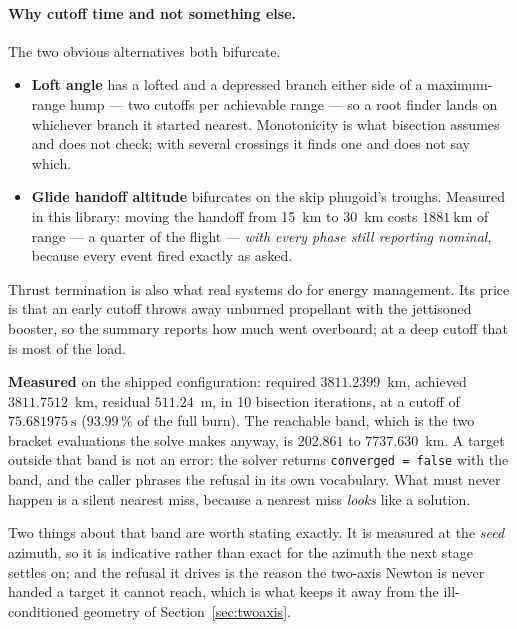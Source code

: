 \documentclass[11pt]{article}
\newcommand{\code}[1]{\texttt{#1}}
\begin{document}
\paragraph{Why cutoff time and not something else.} The two obvious
alternatives both bifurcate.
\begin{itemize}
\item \textbf{Loft angle} has a lofted and a depressed branch either side of a
maximum-range hump --- two cutoffs per achievable range --- so a root finder
lands on whichever branch it started nearest. Monotonicity is what bisection
assumes and does not check; with several crossings it finds one and does not
say which.
\item \textbf{Glide handoff altitude} bifurcates on the skip phugoid's troughs.
Measured in this library: moving the handoff from 15~km to 30~km costs
$1881~\mathrm{km}$ of range --- a quarter of the flight --- \emph{with every
phase still reporting nominal}, because every event fired exactly as asked.
\end{itemize}
Thrust termination is also what real systems do for energy management. Its
price is that an early cutoff throws away unburned propellant with the
jettisoned booster, so the summary reports how much went overboard; at a deep
cutoff that is most of the load.

\textbf{Measured} on the shipped configuration: required $3811.2399$~km,
achieved $3811.7512$~km, residual $511.24$~m, in 10 bisection iterations, at a
cutoff of $75.681975~\mathrm{s}$ ($93.99\,\%$ of the full burn). The reachable
band, which is the two bracket evaluations the solve makes anyway, is
$202.861$ to $7737.630$~km. A target outside that band is not an error: the
solver returns \code{converged = false} with the band, and the caller phrases
the refusal in its own vocabulary. What must never happen is a silent nearest
miss, because a nearest miss \emph{looks} like a solution.

Two things about that band are worth stating exactly. It is measured at the
\emph{seed} azimuth, so it is indicative rather than exact for the azimuth the
next stage settles on; and the refusal it drives is the reason the two-axis
Newton is never handed a target it cannot reach, which is what keeps it away
from the ill-conditioned geometry of Section~\ref{sec:twoaxis}.
\end{document}
